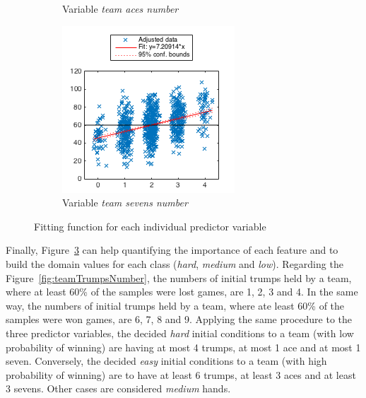 \begin{figure}[h]
\begin{subfigure}[h]{0.32\textwidth}
                \caption{Variable \emph{team aces number}}
                \label{fig:teamAcesNumber}
        \end{subfigure}
        \begin{subfigure}[h]{0.32\textwidth}
                \includegraphics[width=\textwidth]{./img/4/teamSevensNumber}
                \caption{Variable \emph{team sevens number}}
                \label{fig:teamSevensNumber}
        \end{subfigure}
        \caption{Fitting function for each individual predictor variable}
        \label{fig:fitFunctions}
\end{figure}

Finally, Figure~\ref{fig:fitFunctions} can help quantifying the importance of each feature and to build the domain values for each class (\emph{hard}, \emph{medium} and \emph{low}).
Regarding the Figure~\ref{fig:teamTrumpsNumber}, the numbers of initial trumps held by a team, where at least 60\% of the samples were lost games, are 1, 2, 3 and 4.
In the same way, the numbers of initial trumps held by a team, where ate least 60\% of the samples were won games, are 6, 7, 8 and 9.
Applying the same procedure to the three predictor variables, the decided \emph{hard} initial conditions to a team (with low probability of winning) are having at most 4 trumps, at most 1 ace and at most 1 seven.
Conversely, the decided \emph{easy} initial conditions to a team (with high probability of winning) are to have at least 6 trumps, at least 3 aces and at least 3 sevens.
Other cases are considered \emph{medium} hands.

